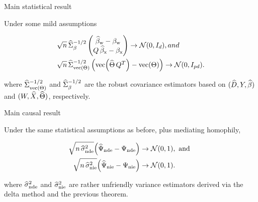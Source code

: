 \documentclass{beamer}
\theoremstyle{remark}
\begin{document}
\begin{frame}{Main statistical result}

    \begin{theorem}

        \vspace{2mm}

        Under some mild assumptions

        \begin{equation*}
            \begin{aligned}
                \sqrt{ n } \,
                 & \Sigmahatbeta^{-1/2}
                \begin{pmatrix}
                    \betawhat - \betaw \\
                    Q \, \betaxhat - \betax
                \end{pmatrix}
                \to
                \Normal{0}{I_d}, and     \\
                \sqrt{ n } \,
                 & \Sigmahattheta^{-1/2}
                \begin{pmatrix}
                    \vecc \paren*{\Thetahat \, Q^T} - \Thetavec
                \end{pmatrix}
                \to
                \Normal{0}{I_{p d}}.
            \end{aligned}
        \end{equation*}

        \noindent where $\widehat{\Sigma}_{\operatorname*{vec} \left(\Theta\right)}^{-1/2}$ and $\widehat{\Sigma}_\beta^{-1/2}$ are the robust covariance estimators based on $(\widehat{D}, Y, \widehat{\beta})$ and $(W, \widehat{X}, \widehat \Theta)$, respectively.
    \end{theorem}
\end{frame}

\begin{frame}{Main causal result}

    \begin{theorem}

        \vspace{2mm}

        Under the same statistical assumptions as before, plus mediating homophily,

        \begin{align*}
            \sqrt{n \, \sigmahatnde} \paren*{\ndehat - \nde}
             & \to
            \Normal{0}{1}, \text { and } \\
            \sqrt{n \, \sigmahatnie} \paren*{\niehat - \nie}
             & \to
            \Normal{0}{1}.
        \end{align*}

        \noindent where $\widehat{\sigma}^2_\text{nde}$ and $\widehat{\sigma}^2_\text{nie}$ are rather unfriendly variance estimators derived via the delta method and the previous theorem.

    \end{theorem}

\end{frame}
\end{document}
